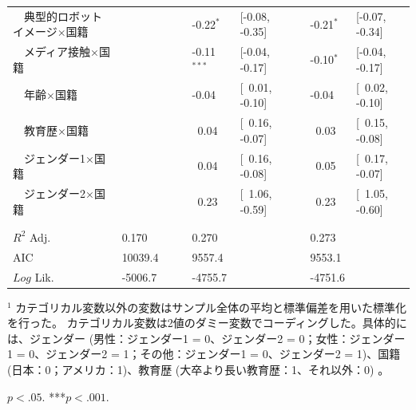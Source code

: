 \documentclass[a4j,12pt]{jreport}
\begin{document}
\begin{table}[]
{\begin{threeparttable}
\begin{tabular}{@{}lllllllll@{}}
~~典型的ロボットイメージ×国籍                                 &                &                      &  & -0.22$^*$  & {[}-0.08, -0.35{]}   &  & -0.21$^*$  & {[}-0.07, -0.34{]}   \\
~~メディア接触×国籍                                &                &                      &  & -0.11$^{***}$       & {[}-0.04, -0.17{]}   &  & -0.10$^*$  & {[}-0.04, -0.17{]}   \\
~~年齢×国籍                                &                &                      &  & -0.04          & {[}~0.01, -0.10{]}  &  & -0.04          & {[}~0.02, -0.10{]}  \\
~~教育歴×国籍                          &                &                      &  & ~0.04         & {[}~0.16, -0.07{]}  &  & ~0.03         & {[}~0.15, -0.08{]}  \\
~~ジェンダー1×国籍                            &                &                      &  & ~0.04         & {[}~0.16, -0.08{]}  &  & ~0.05         & {[}~0.17, -0.07{]}  \\
~~ジェンダー2×国籍                            &                &                      &  & ~0.23         & {[}~1.06, -0.59{]}  &  & ~0.23         & {[}~1.05, -0.60{]}  \\
                                          &                &                      &  &                &                      &  &                &                      \\
                                          &                &                      &  &                &                      &  &                &                      \\
$R^2$ Adj.                                & 0.170          &                      &  & 0.270          &                      &  & 0.273          &                      \\
AIC                                       & 10039.4        &                      &  & 9557.4         &                      &  & 9553.1         &                      \\
$Log$ Lik.                                & -5006.7        &                      &  & -4755.7        &                      &  & -4751.6        &                      \\ \bottomrule
\end{tabular}
    \begin{tablenotes}
      \small
      \item $^{1}$ カテゴリカル変数以外の変数はサンプル全体の平均と標準偏差を用いた標準化を行った。 カテゴリカル変数は2値のダミー変数でコーディングした。具体的には、ジェンダー (男性：ジェンダー1 = 0、ジェンダー2 = 0；女性：ジェンダー1 = 0、ジェンダー2 = 1；その他：ジェンダー1 = 0、ジェンダー2 = 1)、国籍 (日本：0；アメリカ：1)、教育歴 (大卒より長い教育歴：1、それ以外：0) 。
      	\item *$p < .05$. ***$p < .001$.
    \end{tablenotes}
  \end{threeparttable}
  }
\end{table}
\end{document}
